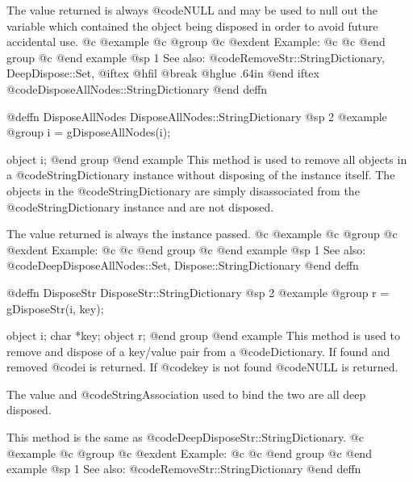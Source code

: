 The value returned is always @code{NULL} and may be used to null out
the variable which contained the object being disposed in order to
avoid future accidental use.
@c @example
@c @group
@c @exdent Example:
@c 
@c @end group
@c @end example
@sp 1
See also:  @code{RemoveStr::StringDictionary, DeepDispose::Set,}
@iftex
@hfil @break @hglue .64in      
@end iftex
@code{DisposeAllNodes::StringDictionary}
@end deffn

















@deffn {DisposeAllNodes} DisposeAllNodes::StringDictionary
@sp 2
@example
@group
i = gDisposeAllNodes(i);

object  i;
@end group
@end example
This method is used to remove all objects in a @code{StringDictionary}
instance without disposing of the instance itself.  The objects in the
@code{StringDictionary} are simply disassociated from the
@code{StringDictionary} instance and are not disposed.

The value returned is always the instance passed.
@c @example
@c @group
@c @exdent Example:
@c 
@c @end group
@c @end example
@sp 1
See also:  @code{DeepDisposeAllNodes::Set, Dispose::StringDictionary}
@end deffn

















@deffn {DisposeStr} DisposeStr::StringDictionary
@sp 2
@example
@group
r = gDisposeStr(i, key);

object  i;
char    *key;
object  r;
@end group
@end example
This method is used to remove and dispose of a key/value pair from a
@code{Dictionary}.  If found and removed @code{i} is returned.  If @code{key}
is not found @code{NULL} is returned.

The value and @code{StringAssociation} used to bind the two are all deep
disposed.

This method is the same as @code{DeepDisposeStr::StringDictionary}.
@c @example
@c @group
@c @exdent Example:
@c 
@c @end group
@c @end example
@sp 1
See also:  @code{RemoveStr::StringDictionary}
@end deffn














